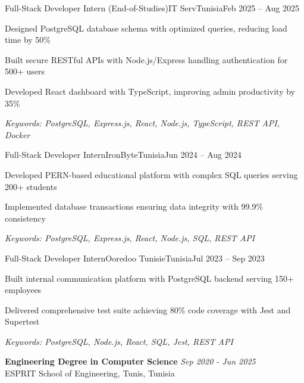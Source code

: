 \documentclass[11pt,a4paper]{article}
\begin{document}
\makecvheader
\makecontactinfo


\begin{internship}{Full-Stack Developer Intern (End-of-Studies)}{IT Serv}{Tunisia}{Feb 2025 -- Aug 2025}{}
  \item Designed PostgreSQL database schema with optimized queries, reducing load time by 50\%
  \item Built secure RESTful APIs with Node.js/Express handling authentication for 500+ users
  \item Developed React dashboard with TypeScript, improving admin productivity by 35\%
  \item[] \textit{\footnotesize Keywords: PostgreSQL, Express.js, React, Node.js, TypeScript, REST API, Docker}
\end{internship}

\begin{internship}{Full-Stack Developer Intern}{IronByte}{Tunisia}{Jun 2024 -- Aug 2024}{}
  \item Developed PERN-based educational platform with complex SQL queries serving 200+ students
  \item Implemented database transactions ensuring data integrity with 99.9\% consistency
  \item[] \textit{\footnotesize Keywords: PostgreSQL, Express.js, React, Node.js, SQL, REST API}
\end{internship}

\begin{internship}{Full-Stack Developer Intern}{Ooredoo Tunisie}{Tunisia}{Jul 2023 -- Sep 2023}{}
  \item Built internal communication platform with PostgreSQL backend serving 150+ employees
  \item Delivered comprehensive test suite achieving 80\% code coverage with Jest and Supertest
  \item[] \textit{\footnotesize Keywords: PostgreSQL, Node.js, React, SQL, Jest, REST API}
\end{internship}

\textbf{Engineering Degree in Computer Science} \hfill \textit{Sep 2020 - Jun 2025}\\[-2pt]
ESPRIT School of Engineering, Tunis, Tunisia
\end{document}

